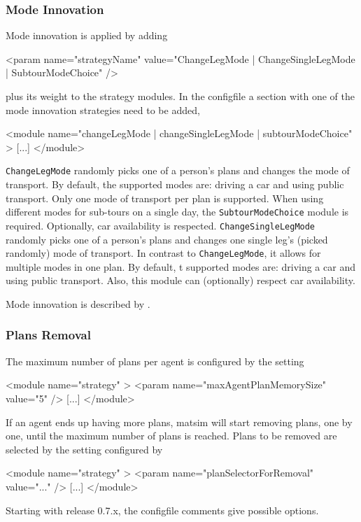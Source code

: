 \subsubsection{Mode Innovation}
\label{sec:modechoice}
Mode innovation is applied by adding 
%
\begin{xml}
	<param name="strategyName" value="{ChangeLegMode | ChangeSingleLegMode | SubtourModeChoice}" />
\end{xml}
%
plus its weight to the strategy modules. In the \gls{configfile} a section with one of the mode innovation strategies need to be added, \ie 
%
\begin{xml}
<module name="{changeLegMode | changeSingleLegMode | subtourModeChoice}" >
    [...]
</module>
\end{xml}
%
\lstinline|ChangeLegMode| randomly picks one of a person's  plans and changes the mode of transport. By default, the supported modes are: driving a car and using public transport. Only one mode of transport per plan is supported.  When using different modes for sub-tours on a single day, the \lstinline|SubtourModeChoice| module is required. Optionally, car availability is respected. \lstinline|ChangeSingleLegMode| randomly picks one of a person's plans and changes one single leg's (picked randomly) mode of transport. In contrast to \lstinline|ChangeLegMode|, it allows for multiple modes in one plan. By default, t supported modes are: driving a car and using public transport. Also, this module can (optionally) respect car availability.

Mode innovation is described by \citet[][]{RieserGretherNagel2008modeChoiceCalculations, MeisterEtAl_WCTRS_2010, CiariEtAl_STRC_2008, CiariEtAl_STRC_2007}.

\subsubsection{Plans Removal}
\label{sec:plans-removal}

The maximum number of plans per agent is configured by the setting 
\begin{xml}
<module name="strategy" >
   <param name="maxAgentPlanMemorySize" value="5" />
   [...]
</module>
\end{xml}
If an agent ends up having more plans, \gls{matsim} will start removing plans, one by one, until the maximum number of plans is reached.  Plans to be removed are selected by the setting configured by
\begin{xml}
<module name="strategy" >
   <param name="planSelectorForRemoval" value="..." />
   [...]
</module>
\end{xml}
Starting with release 0.7.x, the \gls{configfile} comments give possible options.

